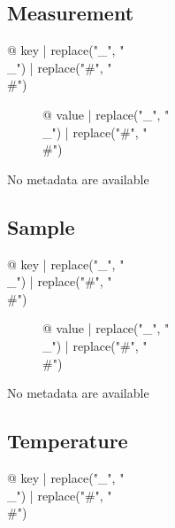 \begin{multicols}{2}

\subsection{Measurement}

\begin{description}
\item[{@ key | replace("_", "\\_") | replace("#", "\\#") }] {@ value | replace("_", "\\_") | replace("#", "\\#") }
\end{description}
No metadata are available

\subsection{Sample}

\begin{description}
\item[{@ key | replace("_", "\\_") | replace("#", "\\#") }] {@ value | replace("_", "\\_") | replace("#", "\\#") }
\end{description}
No metadata are available

\subsection{Temperature}

\begin{description}
\item[{@ key | replace("_", "\\_") | replace("#", "\\#") }] %
\end{description}


\end{multicols}
